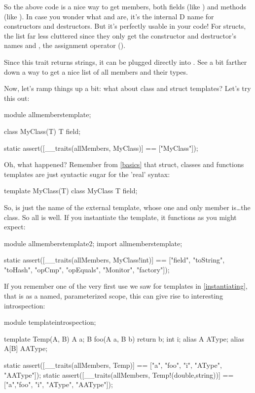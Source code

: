 So the above code is a nice way to get members, both fields (like ) and methods (like ). In case you wonder what  and  are, it's the internal D name for constructors and destructors. But it's perfectly usable in your code! For structs, the list far less cluttered since they only get the constructor and destructor's names and , the assignment operator (\DD{=}).

Since this trait returns strings, it can be plugged directly into . See a bit farther down a way to get a nice list of all members and their types.

Now, let's ramp things up a bit: what about class and struct templates? Let's try this out:

\begin{dcode}
module allmemberstemplate;

class MyClass(T)
{
    T field;
}

static assert([__traits(allMembers, MyClass)] == ["MyClass"]);
\end{dcode}

Oh, what happened? Remember from \autoref{basics} that struct, classes and functions templates are just syntactic sugar for the 'real' syntax:

\begin{dcode}
template MyClass(T)
{
    class MyClass
    {
        T field;
    }
}
\end{dcode}

So,  is just the name of the external template, whose one and only member is\ldots the  class. So all is well. If you instantiate the template, it functions as you might expect:

\begin{dcode}
module allmemberstemplate2;
import allmemberstemplate;

static assert([__traits(allMembers, MyClass!int)] 
           == ["field", "toString", "toHash", "opCmp", 
               "opEquals", "Monitor", "factory"]);
\end{dcode}

If you remember one of the very first use we saw for templates in \ref{instantiating}, that is as a named, parameterized scope, this can give rise to interesting introspection:

\begin{dcode}
module templateintrospection;

template Temp(A, B)
{
    A a;
    B foo(A a, B b) { return b;}
    int i;
    alias A    AType;
    alias A[B] AAType;
}

static assert([__traits(allMembers, Temp)] 
           == ["a", "foo", "i", "AType", "AAType"]);
static assert([__traits(allMembers, Temp!(double,string))] 
           == ["a","foo", "i", "AType", "AAType"]);
\end{dcode} 

